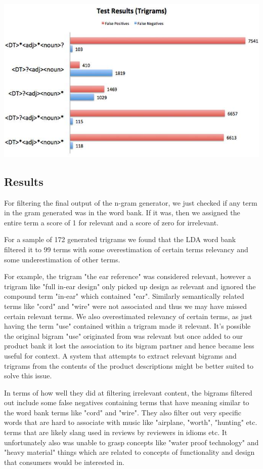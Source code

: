 \documentclass{article}
\begin{document}
\includegraphics[scale = 0.35]{trigramsFalse.jpg}

\subsection{Results}
For filtering the final output of the n-gram generator, we just checked if any term in the gram generated was in the word bank. If it was, then we assigned the entire term a score of 1 for relevant and a score of zero for irrelevant.

For a sample of 172 generated trigrams we found that the LDA word bank filtered it to 99 terms with some overestimation of certain terms relevancy and some underestimation of other terms.

For example, the trigram "the ear reference" was considered relevant, however a trigram like "full in-ear design" only picked up design as relevant and ignored the compound term "in-ear" which contained "ear". Similarly semantically related terms like "cord" and "wire" were not associated and thus we may have missed certain relevant terms. We also overestimated relevancy of certain terms, as just having the term "use" contained within a trigram made it relevant. It's possible the original bigram "use" originated from was relevant but once added to our product bank it lost the association to its bigram partner and hence became less useful for context. A system that attempts to extract relevant bigrams and trigrams from the contents of the product descriptions might be better suited to solve this issue. 

In terms of how well they did at filtering irrelevant content, the bigrams filtered out include some false negatives containing terms that have meaning similar to the word bank terms like "cord" and "wire". They also filter out very specific words that are hard to associate with music like "airplane, "worth", "hunting" etc. terms that are likely slang used in reviews by reviewers in idioms etc. It unfortunately also was unable to grasp concepts like "water proof technology" and "heavy material" things which are related to concepts of functionality and design that consumers would be interested in. 
\end{document}
